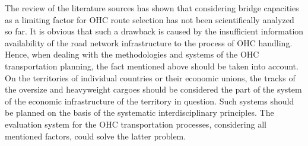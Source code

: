 The review of the literature sources has shown that considering bridge capacities as a limiting factor for OHC route selection has not been scientifically analyzed so far. It is obvious that such a drawback is caused by the insufficient information availability of the road network infrastructure to the process of OHC handling. Hence, when dealing with the methodologies and systems of the OHC transportation planning, the fact mentioned above should be taken into account. On the territories of individual countries or their economic unions, the tracks of the oversize and heavyweight cargoes should be considered the part of the system of the economic infrastructure of the territory in question. Such systems should be planned on the basis of the systematic interdisciplinary principles. The evaluation system for the OHC transportation processes, considering all mentioned factors, could solve the latter problem. 